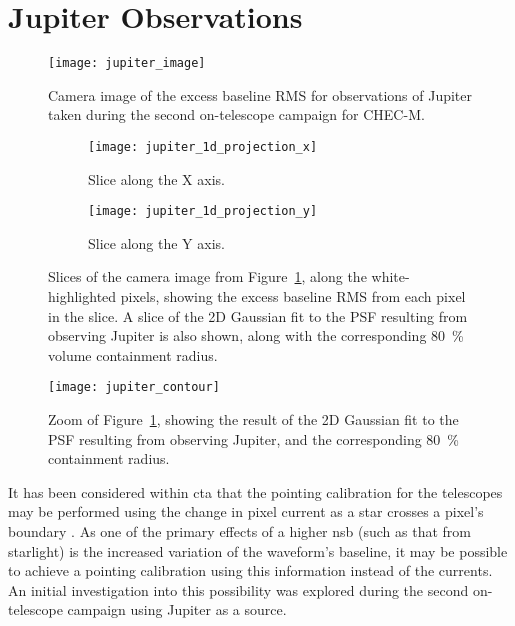 \section{Jupiter Observations}

\begin{figure}
  \centering
  \texttt{[image: jupiter\_image]}
  \caption[Camera image of the excess baseline RMS for observations of Jupiter.]{Camera image of the excess baseline RMS for observations of Jupiter taken during the second on-telescope campaign for CHEC-M.}
  \label{fig:jupiter_image}
\end{figure}

\begin{figure}
  \begin{subfigure}[b]{0.49\textwidth}
    \texttt{[image: jupiter\_1d\_projection\_x]}
    \caption{Slice along the X axis.}
    \label{fig:jupiter_1d_projection_x}
  \end{subfigure}
  \hfill
  \begin{subfigure}[b]{0.49\textwidth}
    \texttt{[image: jupiter\_1d\_projection\_y]}
    \caption{Slice along the Y axis.}
    \label{fig:jupiter_1d_projection_y}
  \end{subfigure}
  \caption[Camera slices of the Jupiter observations.]{Slices of the camera image from Figure~\ref{fig:jupiter_image}, along the white-highlighted pixels, showing the excess baseline RMS from each pixel in the slice. A slice of the 2D Gaussian fit to the PSF resulting from observing Jupiter is also shown, along with the corresponding \SI{80}{\percent} volume containment radius.}
  \label{fig:jupiter_1d_projection}
\end{figure}

\begin{figure}
  \centering
  \texttt{[image: jupiter\_contour]}
  \caption[Zoom of the Jupiter camera image.]{Zoom of Figure~\ref{fig:jupiter_image}, showing the result of the 2D Gaussian fit to the PSF resulting from observing Jupiter, and the corresponding \SI{80}{\percent} containment radius.}
  \label{fig:jupiter_contour}
\end{figure}

It has been considered within \gls{cta} that the pointing calibration for the telescopes may be performed using the change in pixel current as a star crosses a pixel's boundary \cite{Gaug2014}. As one of the primary effects of a higher \gls{nsb} (such as that from starlight) is the increased variation of the waveform's baseline, it may be possible to achieve a pointing calibration using this information instead of the currents. An initial investigation into this possibility was explored during the second on-telescope campaign using Jupiter as a source.


